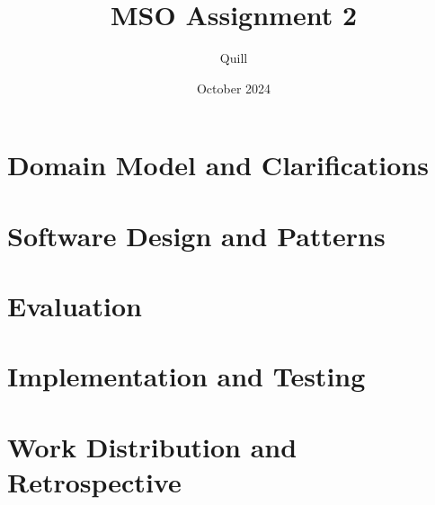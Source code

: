 \documentclass{article}
\title{MSO Assignment 2}
\author{Quill }
\date{October 2024}
\begin{document}
\maketitle

\section{Domain Model and Clarifications}

\section{Software Design and Patterns}

\section{Evaluation}

\section{Implementation and Testing}

\section{Work Distribution and Retrospective}
\end{document}
